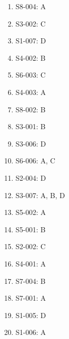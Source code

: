 \documentclass[11pt,a4paper]{article}
\begin{document}
\begin{enumerate}
\item S8-004: A
\item S3-002: C
\item S1-007: D
\item S4-002: B
\item S6-003: C
\item S4-003: A
\item S8-002: B
\item S3-001: B
\item S3-006: D
\item S6-006: A, C
\item S2-004: D
\item S3-007: A, B, D
\item S5-002: A
\item S5-001: B
\item S2-002: C
\item S4-001: A
\item S7-004: B
\item S7-001: A
\item S1-005: D
\item S1-006: A
\end{enumerate}
\end{document}
